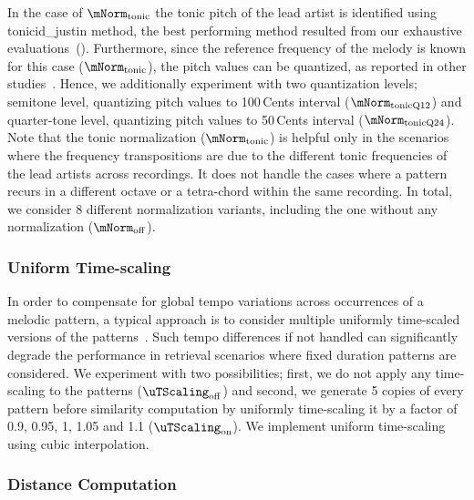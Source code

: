 In the case of $\mNorm_{\mathrm{tonic}}$ the tonic pitch of the lead artist is identified using \acrshort{tonicid_justin} method, the best performing method resulted from our exhaustive evaluations~(). Furthermore, since the reference frequency of the melody is known for this case ($\mNorm_{\mathrm{tonic}}$), the pitch values can be quantized, as reported in other studies~\citep{Ross2012b}. Hence, we additionally experiment with two quantization levels; semitone level, quantizing pitch values to 100\,Cents interval ($\mNorm_{\mathrm{tonicQ12}}$) and quarter-tone level,  quantizing pitch values to 50\,Cents interval ($\mNorm_{\mathrm{tonicQ24}}$). Note that the tonic normalization ($\mNorm_{\mathrm{tonic}}$) is helpful only in the scenarios where the frequency transpositions are due to the different tonic frequencies of the lead artists across recordings. It does not handle the cases where a pattern recurs in a different octave or a tetra-chord within the same recording. In total, we consider 8 different normalization variants, including the one without any normalization ($\mNorm_{\mathrm{off}}$). 


\subsubsection{Uniform Time-scaling}
\label{sec:patterns_melodic_similarity_time_scaling}

In order to compensate for global tempo variations across occurrences of a melodic pattern, a typical approach is to consider multiple uniformly time-scaled versions of the patterns~\citep{mazzoni2001melody,zhu2003query,kotsifakos2012survey}. Such tempo differences if not handled can significantly degrade the performance in retrieval scenarios where fixed duration patterns are considered. We experiment with two possibilities; first,  we do not apply any time-scaling to the patterns ($\uTScaling_{\mathrm{off}}$) and second, we generate 5 copies of every pattern before similarity computation by uniformly time-scaling it by a factor of 0.9, 0.95, 1, 1.05 and 1.1 ($\uTScaling_{\mathrm{on}}$). We implement uniform time-scaling using cubic interpolation. 


\subsubsection{Distance Computation}
\label{sec:patterns_melodic_similarity_dissimilarity measures}

